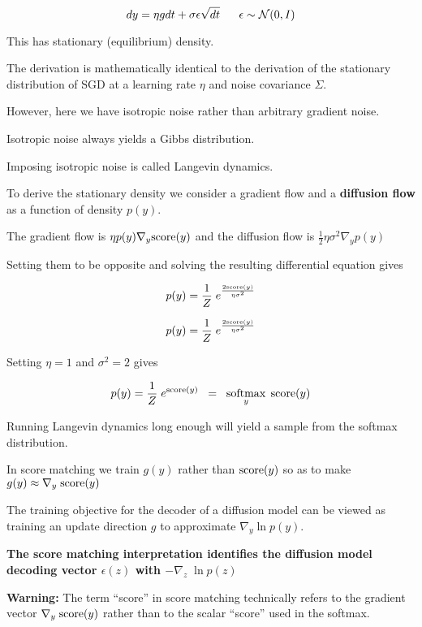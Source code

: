 {

$$dy =  \eta g dt + \sigma \epsilon \sqrt{dt}\;\;\;\;\;\; \epsilon \sim {\cal N}(0,I)$$

\vfill
This has stationary (equilibrium) density.

\vfill
The derivation is mathematically identical to the derivation of the stationary distribution of SGD at a learning rate $\eta$ and noise covariance $\Sigma$.

\vfill
However, here we have isotropic noise rather than arbitrary gradient noise.

\vfill
Isotropic noise always yields a Gibbs distribution.

\vfill
Imposing isotropic noise is called Langevin dynamics.



To derive the stationary density we consider a gradient flow and a {\bf diffusion flow} as a function of density $p(y)$.

\vfill
The gradient flow is $\eta p(y) \nabla_y \mathrm{score}(y)$ and the diffusion flow is $\frac{1}{2}\eta\sigma^2 \nabla_y p(y)$

\vfill
Setting them to be opposite and solving the resulting differential equation gives

\vfill
$$p(y)  = \frac{1}{Z}\;e^{\frac{2\mathrm{score}(y)}{\eta\sigma^2}}$$



$$p(y)  = \frac{1}{Z}\;e^{\frac{2\mathrm{score}(y)}{\eta\sigma^2}}$$

\vfill
Setting $\eta = 1$ and $\sigma^2 = 2$ gives

\vfill
$$p(y)  = \frac{1}{Z}\;e^{\mathrm{score}(y)} \;\;= \;\;\operatorname*{softmax}_y\;\mathrm{score}(y)$$

\vfill
Running Langevin dynamics long enough will yield a sample from the softmax distribution.


In score matching we train $g(y)$ rather than $\mathrm{score}(y)$ so as to make $g(y) \approx \nabla_y \;\mathrm{score}(y)$

\vfill
The training objective for the decoder of a diffusion model can be viewed as training an update direction $g$
to approximate $\nabla_y \ln p(y)$.

\vfill
{\bf The score matching interpretation identifies the diffusion model decoding vector $\epsilon(z)$ with $- \nabla_z\;\ln p(z)$}

\vfill
{\bf Warning:} The term ``score'' in score matching technically refers to the gradient vector $\nabla_y\; \mathrm{score}(y)$ rather than to the scalar ``score'' used in the softmax.

}
